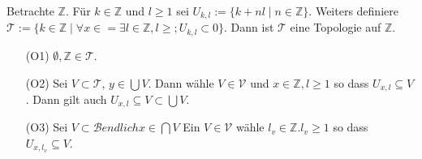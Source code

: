 {
Betrachte $\mathbb{Z}$. Für $k \in \mathbb{Z}$ und $l \ge 1$ sei $U_{k,l} := \{k+nl \mid n \in \mathbb{Z}\}$. 
Weiters definiere $\mathcal{T} := \{ k \in \mathbb{Z} \mid \forall x \in = \exists l \in \mathbb{Z}, l \ge ; U_{k,l} \subset 0\}$.
Dann ist $\mathcal{T}$ eine Topologie auf $\mathbb{Z}$.
\begin{itemize}
    \item[(O1)] $\emptyset, \mathbb{Z} \in \mathcal{T}$.
    \item[(O2)] Sei $V \subset \mathcal{T}$, $y\in \bigcup V$. 
    Dann wähle $V \in \mathcal{V}$ und $x \in \mathbb{Z}, l \ge 1$ so dass $U_{x,l} \subseteq V$.
    Dann gilt auch $U_{x,l} \subseteq V \subset \bigcup V$.
    \item[(O3)] Sei $V \subset\mathcal{B} endlich x \in \bigcap V$ Ein $V \in \mathcal{V}$ 
    wähle $l_v \in \mathbb{Z}. l_v \ge 1$ so dass $U_{x,l_v} \subseteq V$.
\end{itemize}
}
